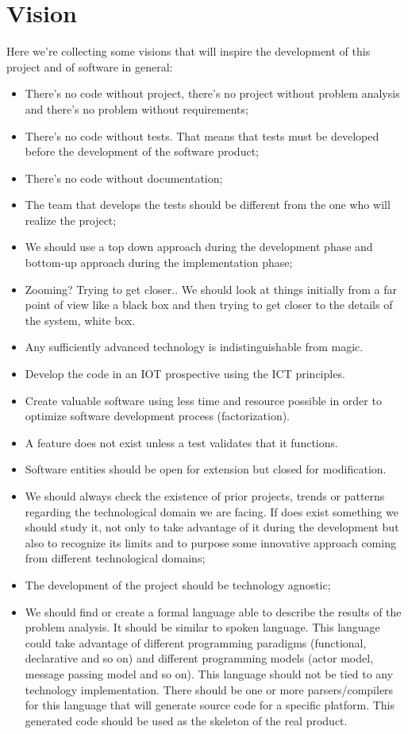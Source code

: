 \documentclass{llncs}
\newcommand{\labelsec}[1]{\label{sec:#1}}
\begin{document}
\section{Vision}
\labelsec{Vision}
Here we're collecting some visions that will inspire the development of this project and of software in general:\\
\begin{itemize}
	\item There's no code without project, there's no project without problem analysis and there's no problem without requirements;
	\item There's no code without tests. That means that tests must be developed before the development of the software product;
	\item There's no code without documentation;
	\item The team that develops the tests should be different from the one who will realize the project;
	\item We should use a top down approach during the development phase and bottom-up approach during the implementation phase;
	\item Zooming? Trying to get closer..
		We should look at things initially from a far point of view like a black box and then trying to get closer to the details of the system, white box.
	\item Any sufficiently advanced technology is indistinguishable from magic.
	\item Develop the code in an IOT prospective using the ICT principles.
	\item Create valuable software using less time and resource possible in order to optimize software development process (factorization).
	\item A feature does not exist unless a test validates that it functions.
	\item Software entities should be open for extension but closed for modification.
	\item We should always check the existence of prior projects, trends or patterns regarding the technological domain we are facing. If does exist something we should study it, not only to take advantage of it during the development but also to recognize its limits and to purpose some innovative approach coming from different technological domains;
	\item The development of the project should be technology agnostic;
	\item We should find or create a formal language able to describe the results of the problem analysis. It should be similar to spoken language. This language could take advantage of different programming paradigms (functional, declarative and so on) and different programming models (actor model, message passing model and so on). This language should not be tied to any technology implementation. There should be one or more parsers/compilers for this language that will generate source code for a specific platform. This generated code should be used as the skeleton of the real product.
\end{itemize}
\end{document}
